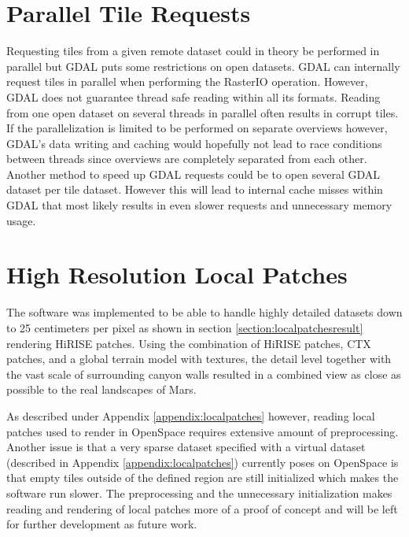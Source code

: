 \section{Parallel Tile Requests}
\label{section:parallelrequests}
Requesting tiles from a given remote dataset could in theory be performed in parallel but GDAL puts some restrictions on open datasets. GDAL can internally request tiles in parallel when performing the RasterIO operation. However, GDAL does not guarantee thread safe reading within all its formats. Reading from one open dataset on several threads in parallel often results in corrupt tiles. If the parallelization is limited to be performed on separate overviews however, GDAL's data writing and caching would hopefully not lead to race conditions between threads since overviews are completely separated from each other. Another method to speed up GDAL requests could be to open several GDAL dataset per tile dataset. However this will lead to internal cache misses within GDAL that most likely results in even slower requests and unnecessary memory usage.

\section{High Resolution Local Patches}
The software was implemented to be able to handle highly detailed datasets down to 25 centimeters per pixel as shown in section \ref{section:localpatchesresult} rendering HiRISE patches. Using the combination of HiRISE patches, CTX patches, and a global terrain model with textures, the detail level together with the vast scale of surrounding canyon walls resulted in a combined view as close as possible to the real landscapes of Mars.

As described under Appendix \ref{appendix:localpatches} however, reading local patches used to render in OpenSpace requires extensive amount of preprocessing. Another issue is that a very sparse dataset specified with a virtual dataset (described in Appendix \ref{appendix:localpatches}) currently poses on OpenSpace is that empty tiles outside of the defined region are still initialized which makes the software run slower. The preprocessing and the unnecessary initialization makes reading and rendering of local patches more of a proof of concept and will be left for further development as future work.